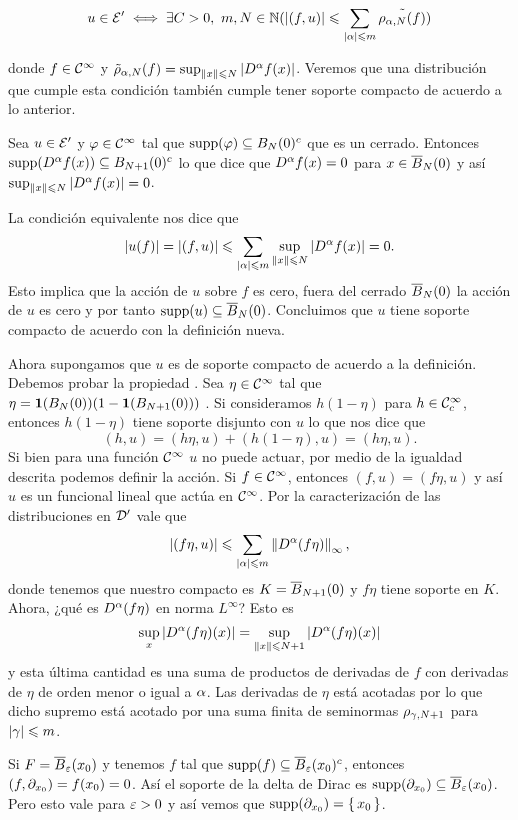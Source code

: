 \documentclass[12pt]{memoir}
\begin{document}
$$u\in\cE'\iff \exists C>0,\ m,N\in\bN(|(f,u)|\leq \sum_{|\al|\leq m}\tilde{\rho_{\al,N}(f)})$$

donde $f\in\mathcal{C}^\infty$ y $\tilde{\rho}_{\alpha,N}(f)=\sup_{\left\|x\right\|\leqslant N}|D^\alpha f(x)|$. Veremos que una distribución que cumple esta condición también cumple tener soporte compacto de acuerdo a lo anterior.

\begin{ptcbp}
  Sea $u\in\mathcal{E}'$ y $\varphi\in\mathcal{C}^\infty$ tal que $\operatorname{supp}(\varphi)\subseteq B_N(0)^c$ que es un cerrado. Entonces  $\operatorname{supp}(D^\alpha f(x))\subseteq B_{N+1}(0)^c$ lo que dice que $D^\alpha f(x)=0$ para $x\in\overline B_N(0)$ y así $\sup_{\left\|x\right\|\leqslant N}|D^\alpha f(x)|=0$.\par 
  La condición equivalente nos dice que 
  $$|u(f)|=|(f,u)|\leqslant\sum_{|\alpha|\leqslant m}\sup_{\left\|x\right\|\leqslant N}|D^\alpha f(x)|=0.$$
  Esto implica que la acción de $u$ sobre $f$ es cero, fuera del cerrado $\overline B_N(0)$ la acción de $u$ es cero y por tanto $\operatorname{supp}(u)\subseteq \overline B_N(0)$. Concluimos que $u$ tiene soporte compacto de acuerdo con la definición nueva.\par 
  Ahora supongamos que $u$ es de soporte compacto de acuerdo a la definición. Debemos probar la propiedad . Sea $\eta\in\mathcal{C}^\infty$ tal que $\eta=\mathbf{1}(B_N(0))(1-\mathbf{1}(B_{N+1}(0)))$ . Si consideramos $h(1-\eta)$ para $h\in\mathcal{C}^\infty_c$, entonces $h(1-\eta)$ tiene soporte disjunto con $u$ lo que nos dice que
  $$(h,u)=(h\eta,u)+(h(1-\eta),u)=(h\eta,u).$$
  Si bien para una función $\mathcal{C}^\infty$ $u$ no puede actuar, por medio de la igualdad descrita podemos definir la acción. Si $f\in\mathcal{C}^\infty$, entonces $(f,u)=(f\eta, u)$ y así $u$ es un funcional lineal que actúa en $\mathcal{C}^\infty$. Por la caracterización de las distribuciones en $\mathcal{D}'$ vale que 
  $$|(f\eta,u)|\leqslant\sum_{|\alpha|\leqslant m}\left\|D^\alpha(f\eta)\right\|_{\infty},$$
  donde tenemos que nuestro compacto es $K=\overline B_{N+1}(0)$ y $f\eta$ tiene soporte en $K$. Ahora, ¿qué es $D^\alpha(f\eta)$ en norma $L^\infty$? Esto es 
  $$\sup_{x}|D^\alpha(f\eta)(x)|=\sup_{\left\|x\right\|\leqslant N+1}|D^\alpha(f\eta)(x)|$$
  y esta última cantidad es una suma de productos de derivadas de $f$ con derivadas de $\eta$ de orden menor o igual a $\alpha$. Las derivadas de $\eta$ está acotadas por lo que dicho supremo está acotado por una suma finita de seminormas $\rho_{\gamma,N+1}$ para $|\gamma|\leqslant m$. 
\end{ptcbp}

\begin{Ex}
  Si $F=\overline B_\varepsilon(x_0)$ y tenemos $f$ tal que $\operatorname{supp}(f)\subseteq \overline{B}_\varepsilon(x_0)^c$, entonces $(f,\partial_{x_0})=f(x_0)=0$. Así el soporte de la delta de Dirac es $\operatorname{supp}(\partial_{x_0})\subseteq\overline B_\varepsilon(x_0)$. Pero esto vale para $\varepsilon>0$ y así vemos que $\operatorname{supp}(\partial_{x_0})=\{\,x_0\,\}$.
\end{Ex}
\end{document}
